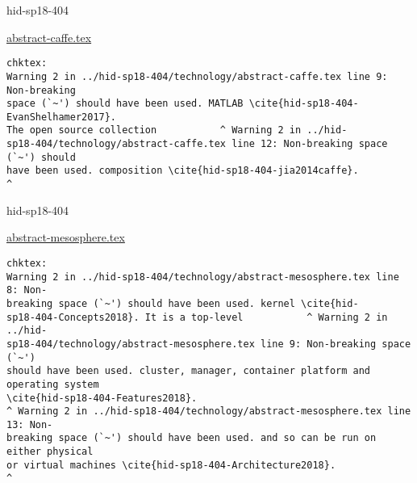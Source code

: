 \begin{IU}

hid-sp18-404

\href{https://github.com/cloudmesh-community/hid-sp18-404/blob/master//technology/abstract-caffe.tex}{abstract-caffe.tex}

\begin{tiny}
\begin{verbatim}
chktex:
Warning 2 in ../hid-sp18-404/technology/abstract-caffe.tex line 9: Non-breaking
space (`~') should have been used. MATLAB \cite{hid-sp18-404-EvanShelhamer2017}.
The open source collection           ^ Warning 2 in ../hid-
sp18-404/technology/abstract-caffe.tex line 12: Non-breaking space (`~') should
have been used. composition \cite{hid-sp18-404-jia2014caffe}.                ^
\end{verbatim}
\end{tiny}
\end{IU}



\begin{IU}

hid-sp18-404

\href{https://github.com/cloudmesh-community/hid-sp18-404/blob/master//technology/abstract-mesosphere.tex}{abstract-mesosphere.tex}

\begin{tiny}
\begin{verbatim}
chktex:
Warning 2 in ../hid-sp18-404/technology/abstract-mesosphere.tex line 8: Non-
breaking space (`~') should have been used. kernel \cite{hid-
sp18-404-Concepts2018}. It is a top-level           ^ Warning 2 in ../hid-
sp18-404/technology/abstract-mesosphere.tex line 9: Non-breaking space (`~')
should have been used. cluster, manager, container platform and operating system
\cite{hid-sp18-404-Features2018}.
^ Warning 2 in ../hid-sp18-404/technology/abstract-mesosphere.tex line 13: Non-
breaking space (`~') should have been used. and so can be run on either physical
or virtual machines \cite{hid-sp18-404-Architecture2018}.
^
\end{verbatim}
\end{tiny}
\end{IU}



